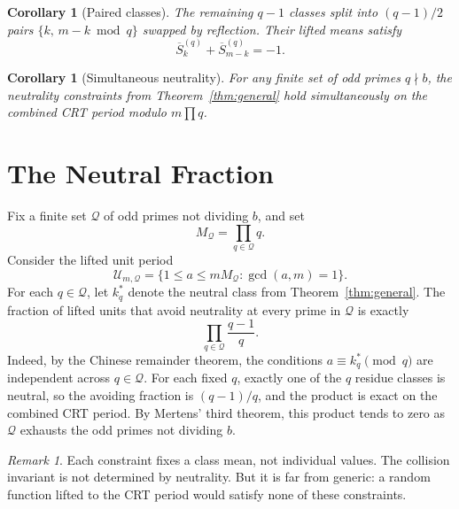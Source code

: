 \documentclass[12pt]{amsart}
\newtheorem{corollary}[theorem]{Corollary}
\theoremstyle{definition}
\theoremstyle{remark}
\newtheorem{remark}[theorem]{Remark}
\begin{document}
\begin{corollary}[Paired classes]\label{cor:paired}
The remaining $q - 1$ classes split into $(q{-}1)/2$
pairs $\{k, \, m{-}k \bmod q\}$ swapped by reflection.
Their lifted means satisfy
\[
\overline S^{(q)}_{k} + \overline S^{(q)}_{m-k} = -1.
\]
\end{corollary}

\begin{corollary}[Simultaneous neutrality]\label{cor:simult}
For any finite set of odd primes $q \nmid b$, the
neutrality constraints from Theorem~\ref{thm:general}
hold simultaneously on the combined CRT period modulo
$m\prod q$.
\end{corollary}

\section{The Neutral Fraction}

Fix a finite set $\mathcal Q$ of odd primes not
dividing $b$, and set
\[
M_{\mathcal Q} = \prod_{q \in \mathcal Q} q.
\]
Consider the lifted unit period
\[
\mathcal U_{m,\mathcal Q}
=
\{1 \le a \le m M_{\mathcal Q} : \gcd(a,m)=1\}.
\]
For each $q \in \mathcal Q$, let $k_q^*$ denote the
neutral class from Theorem~\ref{thm:general}. The
fraction of lifted units that avoid neutrality at
every prime in $\mathcal Q$ is exactly
\[
\prod_{q \in \mathcal Q} \frac{q - 1}{q}.
\]
Indeed, by the Chinese remainder theorem, the
conditions $a \equiv k_q^* \pmod q$ are independent
across $q \in \mathcal Q$. For each fixed $q$, exactly
one of the $q$ residue classes is neutral, so the
avoiding fraction is $(q-1)/q$, and the product is
exact on the combined CRT period. By Mertens' third
theorem, this product tends to zero as $\mathcal Q$
exhausts the odd primes not dividing $b$.

\begin{remark}
Each constraint fixes a class mean, not individual
values. The collision invariant is not determined by
neutrality. But it is far from generic: a random
function lifted to the CRT period would satisfy none
of these constraints.
\end{remark}
\end{document}

